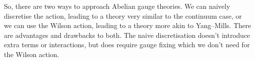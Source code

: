 \documentclass[fleqn]{NotesClass}
\begin{document}
    So, there are two ways to approach Abelian gauge theories.
    We can naively discretise the action, leading to a theory very similar to the continuum case, or we can use the Wilson action, leading to a theory more akin to Yang--Mills.
    There are advantages and drawbacks to both.
    The naive discretisation doesn't introduce extra terms or interactions, but does require gauge fixing which we don't need for the Wilson action.
    
    
    
    
    
%        
    
    \backmatter
    \printindex
\end{document}
